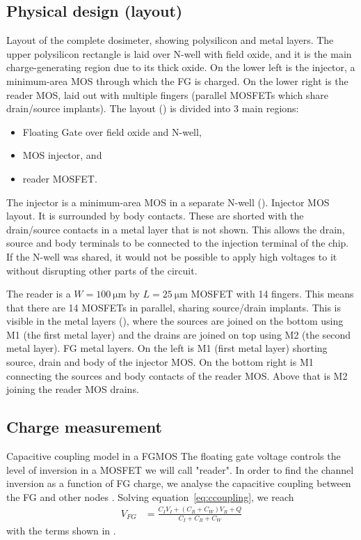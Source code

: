 \subsection{Physical design (layout)}
%
{Layout of the complete dosimeter, showing polysilicon and metal layers.
The upper polysilicon rectangle is laid over N-well with field oxide,
and it is the main charge-generating region due to its thick oxide.
On the lower left is the injector,
a minimum-area MOS through which the FG is charged.
On the lower right is the reader MOS, laid out with multiple fingers
(parallel MOSFETs which share drain/source implants).}
The layout () is divided into 3 main regions:
\begin{itemize}
    \item Floating Gate over field oxide and N-well,
    \item MOS injector, and
    \item reader MOSFET.
\end{itemize}
The injector is a minimum-area MOS in a separate N-well
().
{Injector MOS layout. It is surrounded by body contacts.
These are shorted with the drain/source contacts
in a metal layer that is not shown.  }
This allows the drain, source and body terminals to be connected to the injection terminal of the chip. If the N-well was shared, it would not be possible to apply high voltages to it without disrupting other parts of the circuit.

The reader is a $W=\SI{100}{\micro\meter}$ 
by $L=\SI{25}{\micro\meter}$ MOSFET with 14 fingers.
This means that there are 14 MOSFETs in parallel,
sharing source/drain implants. 
This is visible in the metal layers (),
where the sources are joined on the bottom using M1 (the first metal layer)
and the drains are joined on top using M2 (the second metal layer).
{FG metal layers.
On the left is M1 (first metal layer)
shorting source, drain and body of the injector MOS.
On the bottom right is M1 connecting the sources and body contacts of the reader MOS.
Above that is M2 joining the reader MOS drains.}
\subsection{Charge measurement}
{Capacitive coupling model in a FGMOS}
The floating gate voltage controls the level of inversion
in a MOSFET we will call "reader".
In order to find the channel inversion as a function of FG charge,
we analyse the capacitive coupling between the FG and other nodes
.
Solving equation~\ref{eq:ccoupling}, we reach
\begin{align*}
    V_{FG} &= \frac{C_I V_I + (C_R+C_W) V_R + Q}{C_I+C_R+C_W}
\end{align*}
with the terms shown in .

